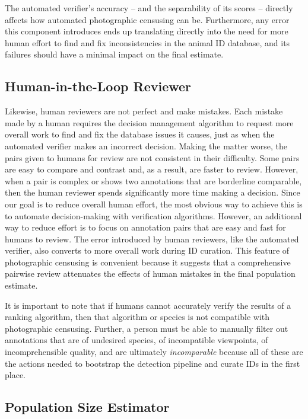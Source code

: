 The automated verifier's accuracy -- and the separability of its scores -- directly affects how automated photographic censusing can be. Furthermore, any error this component introduces ends up translating directly into the need for more human effort to find and fix inconsistencies in the animal ID database, and its failures should have a minimal impact on the final estimate.

\subsection{Human-in-the-Loop Reviewer}

Likewise, human reviewers are not perfect and make mistakes.  Each mistake made by a human requires the decision management algorithm to request more overall work to find and fix the database issues it causes, just as when the automated verifier makes an incorrect decision.  Making the matter worse, the pairs given to humans for review are not consistent in their difficulty.  Some pairs are easy to compare and contrast and, as a result, are faster to review. However, when a pair is complex or shows two annotations that are borderline comparable, then the human reviewer spends significantly more time making a decision.  Since our goal is to reduce overall human effort, the most obvious way to achieve this is to automate decision-making with verification algorithms.  However, an additional way to reduce effort is to focus on annotation pairs that are easy and fast for humans to review.  The error introduced by human reviewers, like the automated verifier, also converts to more overall work during ID curation.  This feature of photographic censusing is convenient because it suggests that a comprehensive pairwise review attenuates the effects of human mistakes in the final population estimate.

It is important to note that if humans cannot accurately verify the results of a ranking algorithm, then that algorithm or species is not compatible with photographic censusing.  Further, a person must be able to manually filter out annotations that are of undesired species, of incompatible viewpoints, of incomprehensible quality, and are ultimately \textit{incomparable} because all of these are the actions needed to bootstrap the detection pipeline and curate IDs in the first place.

\subsection{Population Size Estimator}

